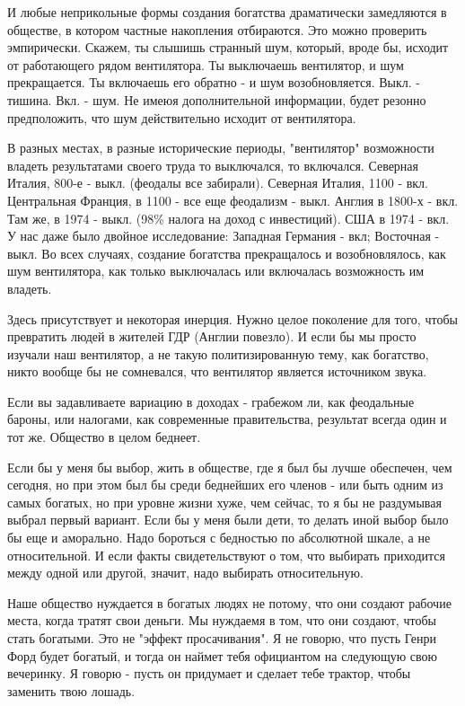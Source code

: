 \documentclass[ebook,12pt,oneside,openany]{memoir}
\begin{document}
И любые неприкольные формы создания богатства драматически замедляются
в обществе, в котором частные накопления отбираются. Это можно
проверить эмпирически. Скажем, ты слышишь странный шум, который, вроде
бы, исходит от работающего рядом вентилятора. Ты выключаешь
вентилятор, и шум прекращается. Ты включаешь его обратно - и шум
возобновляется. Выкл. - тишина. Вкл. - шум. Не имеюя дополнительной
информации, будет резонно предположить, что шум действительно исходит
от вентилятора.

В разных местах, в разные исторические периоды, "вентилятор"
возможности владеть результатами своего труда то выключался, то
включался. Северная Италия, 800-е - выкл. (феодалы все забирали).
Северная Италия, 1100 - вкл. Центральная Франция, в 1100 - все еще
феодализм - выкл. Англия в 1800-х - вкл. Там же, в 1974 - выкл. (98\%
налога на доход с инвестиций). США в 1974 - вкл. У нас даже было
двойное исследование: Западная Германия - вкл; Восточная - выкл. Во
всех случаях, создание богатства прекращалось и возобновлялось, как
шум вентилятора, как только выключалась или включалась возможность им
владеть.

Здесь присутствует и некоторая инерция. Нужно целое поколение для
того, чтобы превратить людей в жителей ГДР (Англии повезло). И если бы
мы просто изучали наш вентилятор, а не такую политизированную тему,
как богатство, никто вообще бы не сомневался, что вентилятор является
источником звука.

Если вы задавливаете вариацию в доходах - грабежом ли, как феодальные
бароны, или налогами, как современные правительства, результат всегда
один и тот же. Общество в целом беднеет.

Если бы у меня бы выбор, жить в обществе, где я был бы лучше
обеспечен, чем сегодня, но при этом был бы среди беднейших его членов
- или быть одним из самых богатых, но при уровне жизни хуже, чем
сейчас, то я бы не раздумывая выбрал первый вариант. Если бы у меня
были дети, то делать иной выбор было бы еще и аморально. Надо бороться
с бедностью по абсолютной шкале, а не относительной. И если факты
свидетельствуют о том, что выбирать приходится между одной или другой,
значит, надо выбирать относительную.

Наше общество нуждается в богатых людях не потому, что они создают
рабочие места, когда тратят свои деньги. Мы нуждаемя в том, что они
создают, чтобы стать богатыми. Это не "эффект просачивания". Я не
говорю, что пусть Генри Форд будет богатый, и тогда он наймет тебя
официантом на следующую свою вечеринку. Я говорю - пусть он придумает
и сделает тебе трактор, чтобы заменить твою лошадь.
\end{document}
